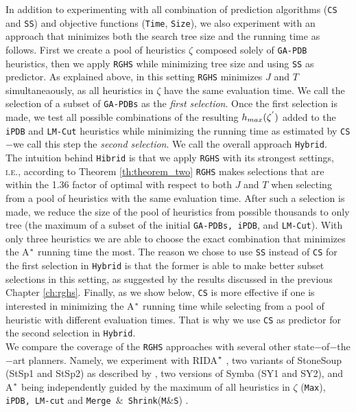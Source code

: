 In addition to experimenting with all combination of prediction algorithms (\texttt{CS} and \texttt{SS}) and objective functions (\texttt{Time}, \texttt{Size}), we also experiment with an approach that minimizes both the search tree size and the running time as follows. First we create a pool of heuristics $\zeta$ composed solely of \texttt{GA-PDB} heuristics, then we apply \texttt{RGHS} while minimizing tree size and using \texttt{SS} as predictor. As explained above, in this setting \texttt{RGHS} minimizes $J$ and $T$ simultaneaously, as all heuristics in $\zeta$ have the same evaluation time. We call the selection of a subset of \texttt{GA-PDBs} as the \textit{first selection}. Once the first selection is made, we test all possible combinations of the resulting $h_{max}(\zeta\sp{'})$ added to the \texttt{iPDB} and \texttt{LM-Cut} heuristics while minimizing the running time as estimated by \texttt{CS}$-$we call this step the \textit{second selection}. We call the overall approach \texttt{Hybrid}.\\

The intuition behind \texttt{Hibrid} is that we apply \texttt{RGHS} with its strongest settings, \textsc{i.e.,} according to Theorem \ref{th:theorem_two} \texttt{RGHS} makes selections that are within the 1.36 factor of optimal with respect to both $J$ and $T$ when selecting from a pool of heuristics with the same evaluation time. After such a selection is made, we reduce the size of the pool of heuristics from possible thousands to only tree (the maximum of a subset of the initial \texttt{GA-PDBs, iPDB}, and \texttt{LM-Cut}). With only three heuristics we are able to choose the exact combination that minimizes the A$\sp{*}$ running time the most. The reason we chose to use \texttt{SS} instead of \texttt{CS} for the first selection in \texttt{Hybrid} is that the former is able to make better subset selections in this setting, as suggested by the results discussed in the previous Chapter \ref{ch:rghs}. Finally, as we show below, \texttt{CS} is more effective if one is interested in minimizing the A$\sp{*}$ running time while selecting from a pool of heuristic with different evaluation times. That is why we use \texttt{CS} as predictor for the second selection in \texttt{Hybrid}.\\

We compare the coverage of the \texttt{RGHS} approaches with several other state$-$of$-$the$-$art planners. Namely, we experiment with RIDA$\sp{*}$ \cite{BarleySantiagoOver}, two variants of StoneSoup (StSp1 and StSp2) as described by \cite{nissim2011computing}, two versions of Symba (SY1 and SY2), and A$\sp{*}$ being independently guided by the maximum of all heuristics in $\zeta$ (\texttt{Max}), \texttt{iPDB, LM-cut} and \texttt{Merge $\&$ Shrink}(\texttt{M$\&$S}) \cite{nissim2011computing}.\\

